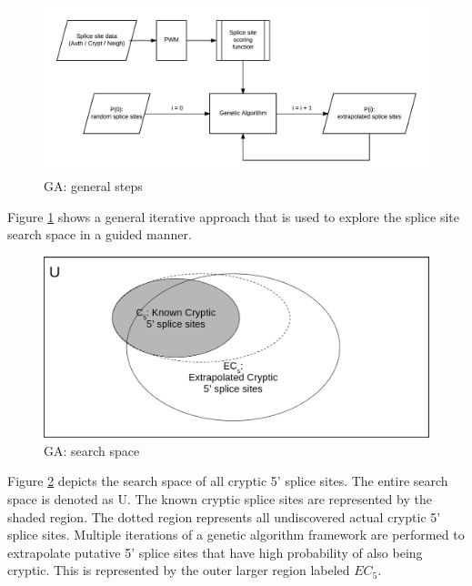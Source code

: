 \documentclass[12pt,a4paper]{article}
\begin{document}
   	\begin{figure}[H]
   		\includegraphics[width=\textwidth]{"setup"}
   		\caption{GA: general steps}
   		\centering
   		\label{fig:ga_setup}
   	\end{figure}
	Figure \ref{fig:ga_setup} shows a general iterative approach that is used to explore the splice site search space in a guided manner.

   	\begin{figure}[H]
   		\includegraphics[width=\textwidth]{"ga_searchspace"}
   		\caption{GA: search space}
   		\centering
   		\label{fig:ga_searchspace}
   	\end{figure}
   	Figure \ref{fig:ga_searchspace} depicts the search space of all cryptic 5' splice sites. The entire search space is denoted as U. The known cryptic splice sites are represented by the shaded region. The dotted region represents all undiscovered actual cryptic 5' splice sites. Multiple iterations of a genetic algorithm framework are performed to extrapolate putative 5' splice sites that have high probability of also being cryptic. This is represented by the outer larger region labeled $EC_5$.
\end{document}
